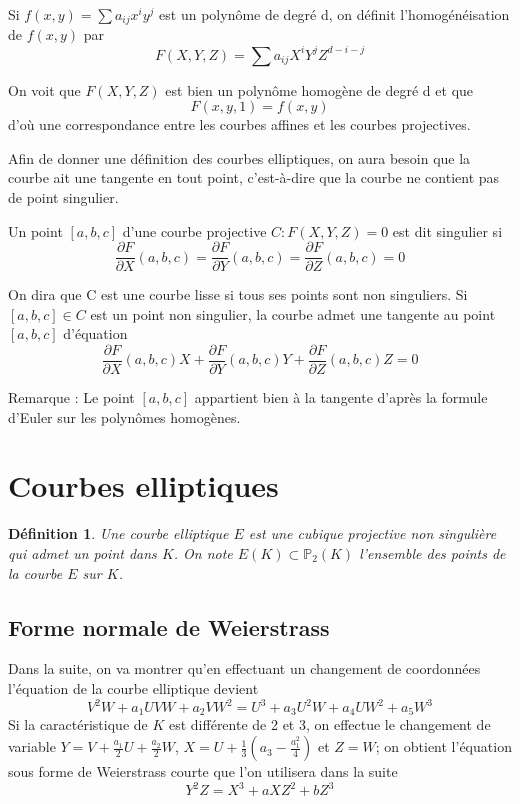 \documentclass{article}
\newtheorem{definition}{Définition}
\begin{document}
Si $f(x,y) = \sum{a_{ij}x^{i}y^{j}}$ est un polynôme de degré d, on définit l'homogénéisation de $f(x,y)$ par
\begin{equation*}
F(X,Y,Z)=\sum{a_{ij}X^{i}Y^{j}Z^{d-i-j}}
\end{equation*}

On voit que $F(X,Y,Z)$ est bien un polynôme homogène de degré d et que $$F(x,y,1)=f(x,y)$$
d'où une correspondance entre les courbes affines et les courbes projectives.

Afin de donner une définition des courbes elliptiques, on aura besoin que la courbe ait une tangente
en tout point, c'est-à-dire que la courbe ne contient pas de point singulier.

Un point $[a,b,c]$ d'une courbe projective $C: F(X,Y,Z)=0$ est dit singulier si
\begin{equation*}
\frac{\partial F}{\partial X}(a,b,c) = \frac{\partial F}{\partial Y}(a,b,c) = \frac{\partial F}{\partial Z}(a,b,c) = 0
\end{equation*}

On dira que C est une courbe lisse si tous ses points sont non singuliers. Si $[a,b,c]\in C$ est un point non singulier,
la courbe admet une tangente au point $[a,b,c]$ d'équation
\begin{equation*}
\frac{\partial F}{\partial X}(a,b,c)X + \frac{\partial F}{\partial Y}(a,b,c)Y + \frac{\partial F}{\partial Z}(a,b,c)Z = 0
\end{equation*}

Remarque : Le point $[a,b,c]$ appartient bien à la tangente d'après la formule d'Euler sur les polynômes homogènes.

\section{Courbes elliptiques}

\begin{definition}
Une courbe elliptique $E$ est une cubique projective non singulière qui admet un point dans $K$.
On note $E(K) \subset \mathbb{P}_{2}(K)$ l'ensemble des points de la courbe $E$ sur $K$.
\end{definition}

\subsection{Forme normale de Weierstrass}
Dans la suite, on va montrer qu'en effectuant un changement de coordonnées l'équation de la courbe elliptique devient
\begin{equation*}
V^2W + a_{1}UVW + a_{2}VW^2 = U^3 + a_{3}U^2W + a_{4}UW^2 + a_{5}W^3
\end{equation*}
Si la caractéristique de $K$ est différente de 2 et 3, on effectue le changement de variable
$Y=V + \frac{a_{1}}{2}U + \frac{a_{2}}{2}W$, $X=U+\frac{1}{3}(a_{3}-\frac{a_{1}^2}{4})$ et $Z=W$; on obtient l'équation sous forme de Weierstrass courte que l'on utilisera dans la suite
\begin{equation}
\label{Weier}
Y^2Z=X^3+aXZ^2+bZ^3
\end{equation}
\end{document}
